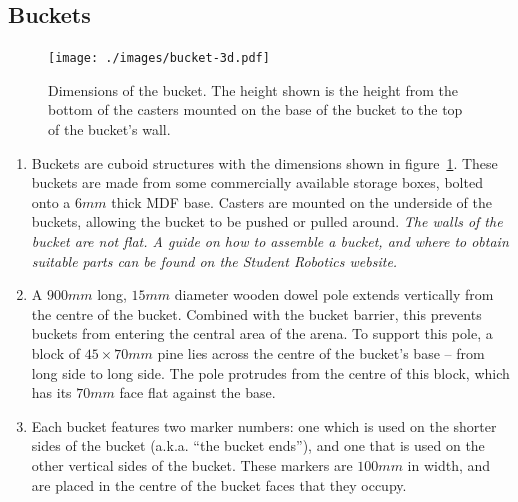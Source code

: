 \subsection{Buckets}
\label{sub:buckets}
\begin{figure}
  \centering
  \texttt{[image: ./images/bucket-3d.pdf]}
  \caption{Dimensions of the bucket.  The height shown is the height from the bottom of the casters mounted on the base of the bucket to the top of the bucket's wall.}
  \label{fig:bucket-3d}
\end{figure}

\begin{enumerate}
\item Buckets are cuboid structures with the dimensions shown in figure~\ref{fig:bucket-3d}.  These buckets are made from some commercially available storage boxes, bolted onto a $6mm$ thick MDF base.  Casters are mounted on the underside of the buckets, allowing the bucket to be pushed or pulled around.  \textit{The walls of the bucket are not flat.  A guide on how to assemble a bucket, and where to obtain suitable parts can be found on the Student Robotics website.}

\item A $900mm$ long, $15mm$ diameter wooden dowel pole extends vertically from the centre of the bucket.  Combined with the bucket barrier, this prevents buckets from entering the central area of the arena.  To support this pole, a block of $45 \times 70mm$ pine lies across the centre of the bucket's base -- from long side to long side.  The pole protrudes from the centre of this block, which has its $70mm$ face flat against the base. 

\item Each bucket features two marker numbers: one which is used on the shorter sides of the bucket (a.k.a. ``the bucket ends''), and one that is used on the other vertical sides of the bucket.  These markers are $100mm$ in width, and are placed in the centre of the bucket faces that they occupy.

\end{enumerate}

\clearpage

